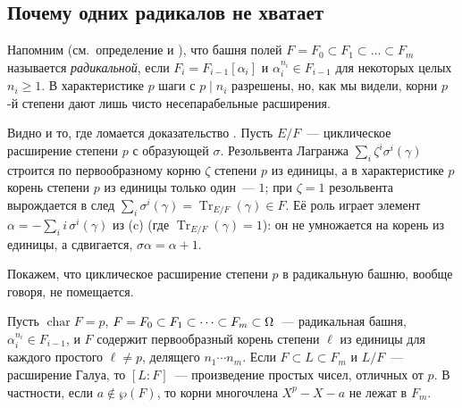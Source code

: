 \subsection*{Почему одних радикалов не хватает}

Напомним (см.\ определение  и ), что башня полей $F=F_0\subset F_1\subset\dots\subset F_m$ называется
\emph{радикальной}, если $F_i=F_{i-1}[\alpha_i]$ и $\alpha_i^{n_i}\in F_{i-1}$ для некоторых целых $n_i\ge1$. В
характеристике $p$ шаги с $p\mid n_i$ разрешены, но, как мы видели, корни $p$-й степени дают лишь чисто несепарабельные
расширения.

Видно и то, где ломается доказательство . Пусть $E/F$~--- циклическое расширение степени $p$ с образующей $\sigma$.
Резольвента Лагранжа $\sum_i\zeta^i\sigma^i(\gamma)$ строится по первообразному корню $\zeta$ степени $p$ из единицы, а в
характеристике $p$ корень степени $p$ из единицы только один~--- $1$; при $\zeta=1$ резольвента вырождается в след
$\sum_i\sigma^i(\gamma)=\operatorname{Tr}_{E/F}(\gamma)\in F$. Её роль играет элемент $\alpha=-\sum_ii\,\sigma^i(\gamma)$
из (c) (где $\operatorname{Tr}_{E/F}(\gamma)=1$): он не умножается на корень из единицы, а сдвигается,
$\sigma\alpha=\alpha+1$.

Покажем, что циклическое расширение степени $p$ в радикальную башню, вообще говоря, не помещается.

\begin{proposition}[5.32i]
Пусть $\operatorname{char}F=p$, $F=F_0\subset F_1\subset\dots\subset F_m\subset\Omega$~--- радикальная башня, $\alpha_i^{n_i}\in F_{i-1}$,
и $F$ содержит первообразный корень степени $\ell$ из единицы для каждого простого $\ell\ne p$, делящего $n_1\cdots n_m$.
Если $F\subset L\subset F_m$ и $L/F$~--- расширение Галуа, то $[L:F]$~--- произведение простых чисел, отличных от $p$. В
частности, если $a\notin\wp(F)$, то корни многочлена $X^p-X-a$ не лежат в $F_m$.
\end{proposition}

